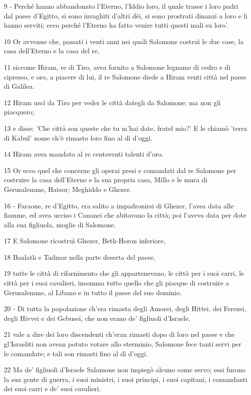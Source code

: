 \par 9 - Perché hanno abbandonato l'Eterno, l'Iddio loro, il quale trasse i loro padri dal paese d'Egitto, si sono invaghiti d'altri dèi, si sono prostrati dinanzi a loro e li hanno serviti; ecco perché l'Eterno ha fatto venire tutti questi mali su loro'.
\par 10 Or avvenne che, passati i venti anni nei quali Salomone costruì le due case, la casa dell'Eterno e la casa del re,
\par 11 siccome Hiram, re di Tiro, avea fornito a Salomone legname di cedro e di cipresso, e oro, a piacere di lui, il re Salomone diede a Hiram venti città nel paese di Galilea.
\par 12 Hiram uscì da Tiro per veder le città dategli da Salomone; ma non gli piacquero;
\par 13 e disse: 'Che città son queste che tu m'hai date, fratel mio?' E le chiamò 'terra di Kabul' nome ch'è rimasto loro fino al dì d'oggi.
\par 14 Hiram avea mandato al re centoventi talenti d'oro.
\par 15 Or ecco quel che concerne gli operai presi e comandati dal re Salomone per costruire la casa dell'Eterno e la sua propria casa, Millo e le mura di Gerusalemme, Hatsor; Meghiddo e Ghezer.
\par 16 - Faraone, re d'Egitto, era salito a impadronirsi di Ghezer, l'avea data alle fiamme, ed avea ucciso i Cananei che abitavano la città; poi l'aveva data per dote alla sua figliuola, moglie di Salomone.
\par 17 E Salomone ricostruì Ghezer, Beth-Horon inferiore,
\par 18 Baalath e Tadmor nella parte deserta del paese,
\par 19 tutte le città di rifornimento che gli appartenevano, le città per i suoi carri, le città per i suoi cavalieri, insomma tutto quello che gli piacque di costruire a Gerusalemme, al Libano e in tutto il paese del suo dominio.
\par 20 - Di tutta la popolazione ch'era rimasta degli Amorei, degli Hittei, dei Ferezei, degli Hivvei e dei Gebusei, che non erano de' figliuoli d'Israele,
\par 21 vale a dire dei loro discendenti ch'eran rimasti dopo di loro nel paese e che gl'Israeliti non avean potuto votare allo sterminio, Salomone fece tanti servi per le comandate; e tali son rimasti fino al dì d'oggi.
\par 22 Ma de' figliuoli d'Israele Salomone non impiegò alcuno come servo; essi furono la sua gente di guerra, i suoi ministri, i suoi principi, i suoi capitani, i comandanti dei suoi carri e de' suoi cavalieri.
